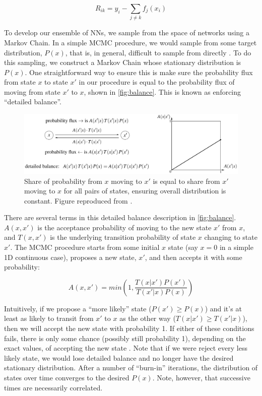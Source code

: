 \documentclass[12pt]{article}
\begin{document}
$$
R_{ik} = y_i - \sum_{j\neq k} f_j(x_i)
$$

To develop our ensemble of NNs, we sample from the space of networks using a Markov Chain.  In a simple MCMC procedure, we would sample from some target distribution, $P(x)$, that is, in general, difficult to sample from directly \cite{haugh2021tutorial}.  To do this sampling, we construct a Markov Chain whose stationary distribution is $P(x)$.  One straightforward way to ensure this is make sure the probability flux from state $x$ to state $x'$ in our procedure is equal to the probability flux of moving from state $x'$ to $x$, shown in \autoref{fig:balance}.  This is known as enforcing ``detailed balance''.

\begin{figure}[htb]
\centering
    \includegraphics[scale=0.4]{balance.png}
    \caption{Share of probability from $x$ moving to $x'$ is equal to share from $x'$ moving to $x$ for all pairs of states, ensuring overall distribution is constant.  Figure reproduced from \cite{stepanov2021math}.}
    \label{fig:balance}
\end{figure}

There are several terms in this detailed balance description in \autoref{fig:balance}.  $A(x,x')$ is the acceptance probability of moving to the new state $x'$ from $x$, and $T(x,x')$ is the underlying transition probability of state $x$ changing to state $x'$.  The MCMC procedure starts from some initial $x$ state (say $x=0$ in a simple 1D continuous case), proposes a new state, $x'$, and then accepts it with some probability:

$$
A(x,x') = min(1, \frac{T(x|x') P(x')}{T(x'|x) P(x)})
$$

Intuitively, if we propose a ``more likely'' state ($P(x') \geq P(x)$) and it's at least as likely to transit from $x'$ to $x$ as the other way ($T(x|x') \geq T(x'|x)$), then we will accept the new state with probability 1.  If either of these conditions fails, there is only some chance (possibly still probability 1), depending on the exact values, of accepting the new state \cite{stepanov2021math}.  Note that if we were reject every less likely state, we would lose detailed balance and no longer have the desired stationary distribution.  After a number of ``burn-in'' iterations, the distribution of states over time converges to the desired $P(x)$.  Note, however, that successive times are necessarily correlated.
\end{document}

